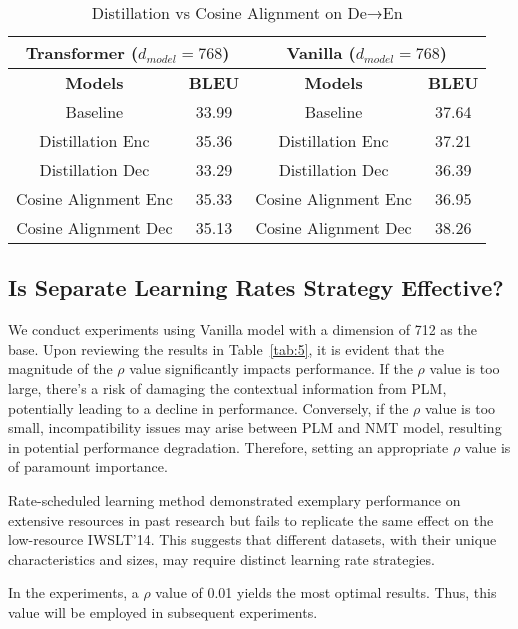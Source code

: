 \documentclass[conference]{IEEEtran}
\begin{document}
\begin{table}[!tb]
\renewcommand{\arraystretch}{1.3} \centering
\caption{Distillation vs Cosine Alignment on De→En}
\label{tab:4}
\begin{tabular}{|c|c|c|c|}
\hline
\multicolumn{2}{|c|}{\textbf{Transformer ($d_{model}=768$)}} & \multicolumn{2}{|c|}{\textbf{Vanilla ($d_{model}=768$)}} \\
\hline
\textbf{Models} & \textbf{BLEU} & \textbf{Models} & \textbf{BLEU} \\
\hline
Baseline & 33.99 & Baseline & 37.64 \\
Distillation Enc & 35.36 & Distillation Enc & 37.21 \\
Distillation Dec & 33.29 & Distillation Dec & 36.39 \\
Cosine Alignment Enc & 35.33 & Cosine Alignment Enc & 36.95 \\
Cosine Alignment Dec & 35.13 & Cosine Alignment Dec & 38.26 \\
\hline
\end{tabular}
\end{table}

\subsection{Is Separate Learning Rates Strategy Effective?}
We conduct experiments using Vanilla model with a dimension of 712 as the base. Upon reviewing the results in Table~\ref{tab:5}, it is evident that the magnitude of the $\rho$ value significantly impacts performance. If the $\rho$ value is too large, there's a risk of damaging the contextual information from PLM, potentially leading to a decline in performance. Conversely, if the $\rho$ value is too small, incompatibility issues may arise between PLM and NMT model, resulting in potential performance degradation. Therefore, setting an appropriate $\rho$ value is of paramount importance.

Rate-scheduled learning method \cite{Yang2019} demonstrated exemplary performance on extensive resources in past research but fails to replicate the same effect on the low-resource IWSLT'14. This suggests that different datasets, with their unique characteristics and sizes, may require distinct learning rate strategies.

In the experiments, a $\rho$ value of 0.01 yields the most optimal results. Thus, this value will be employed in subsequent experiments.
\end{document}
